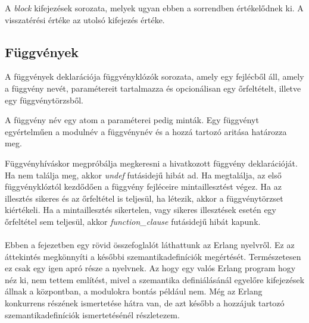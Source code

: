 

A \textit{block} kifejezések sorozata, melyek ugyan ebben a sorrendben értékelődnek ki. A visszatérési értéke az utolsó kifejezés értéke.

\subsection{Függvények}

A függvények deklarációja függvényklózók sorozata, amely egy fejlécből áll, amely a függvény nevét, paramétereit tartalmazza és opcionálisan egy őrfeltételt, illetve egy függvénytörzsből.



A függvény név egy atom a paraméterei pedig minták. Egy függvényt egyértelműen a modulnév a függvénynév és a hozzá tartozó aritása határozza meg.

Függvényhíváskor megpróbálja megkeresni a hivatkozott függvény deklarációját. Ha nem találja meg, akkor \textit{undef} futásidejű hibát ad. Ha megtalálja, az első függvényklóztól kezdődően a függvény fejléceire mintaillesztést végez. Ha az illesztés sikeres és az őrfeltétel is teljesül, ha létezik, akkor a függvénytörzset kiértékeli. Ha a mintaillesztés sikertelen, vagy sikeres illesztések esetén egy őrfeltétel sem teljesül, akkor \textit{function\_clause} futásidejű hibát kapunk.

\paragraph{}
Ebben a fejezetben egy rövid összefoglalót láthattunk az Erlang nyelvről. Ez az áttekintés megkönnyíti a későbbi szemantikadefiníciók megértését. Természetesen ez csak egy igen apró része a nyelvnek. Az hogy egy valós Erlang program hogy néz ki, nem tettem említést, mivel a szemantika definiálásánál egyelőre kifejezések állnak a központban, a modulokra bontás például nem. Még az Erlang konkurrens részének ismertetése hátra van, de azt később a hozzájuk tartozó szemantikadefiníciók ismertetésénél részletezem.